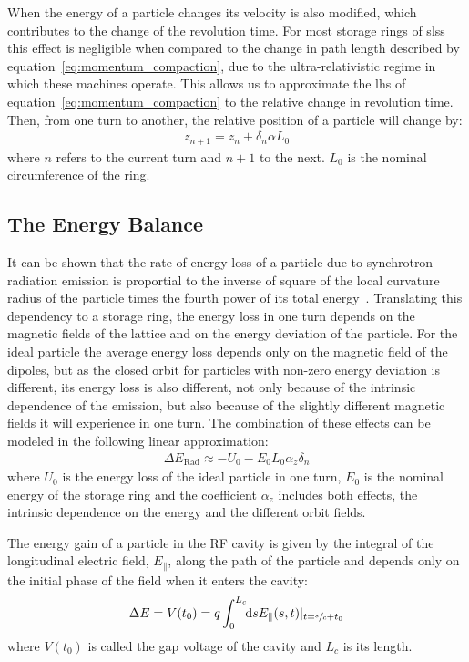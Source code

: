     When the energy of a particle changes its velocity is also modified, which contributes to the change of the revolution time. For most storage rings of \glspl{sls} this effect is negligible when compared to the change in path length described by equation~\eqref{eq:momentum_compaction}, due to the ultra-relativistic regime in which these machines operate. This allows us to approximate the \gls{lhs} of equation~\eqref{eq:momentum_compaction} to the relative change in revolution time. Then, from one turn to another, the relative position of a particle will change by:
	\begin{align}\label{eq:revolution_time_variation}
		z_{n+1} = z_n + \delta_n\alpha L_0
	\end{align}
	where $n$ refers to the current turn and $n+1$ to the next. $L_0$ is the nominal circumference of the ring.

\subsection{The Energy Balance}

	It can be shown that the rate of energy loss of a particle due to synchrotron radiation emission is proportial to the inverse of square of the local curvature radius of the particle times the fourth power of its total energy~\cite[pp. 661: eq. 14.31]{Jackson1975}. Translating this dependency to a storage ring, the energy loss in one turn depends on the magnetic fields of the lattice and on the energy deviation of the particle. For the ideal particle the average energy loss depends only on the magnetic field of the dipoles, but as the closed orbit for particles with non-zero energy deviation is different, its energy loss is also different, not only because of the intrinsic dependence of the emission, but also because of the slightly different magnetic fields it will experience in one turn. The combination of these effects can be modeled in the following linear approximation:
	\begin{align}\label{eq:radiation_loss}
		\Delta E_\text{Rad} \approx -U_0 - E_0L_0\alpha_z\delta_n
	\end{align}
	where $U_0$ is the energy loss of the ideal particle in one turn, $E_0$ is the nominal energy of the storage ring and the coefficient $\alpha_z$ includes both effects, the intrinsic dependence on the energy and the different orbit fields.

	The energy gain of a particle in the RF cavity is given by the integral of the longitudinal electric field, $E_\parallel$, along the path of the particle and depends only on the initial phase of the field when it enters the cavity:
	\begin{align}
		\Delta E = V(t_0) = q\defint{s}{E_\parallel(s,t)|_{t=\sfrac{s}{c}+t_0}}{0}{L_c}
	\end{align}
	where $V(t_0)$ is called the gap voltage of the cavity and $L_c$ is its length.

